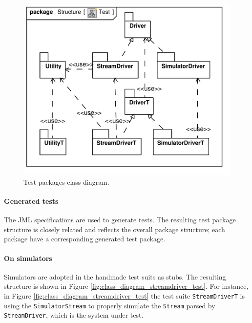 \documentclass[english]{lni}
\newcommand{\lil}[1]{\texttt{\lstinline|#1|}}
\begin{document}
\begin{figure}[htb!]
  \centering
  \includegraphics[scale=0.35]{UML_model/Class_Diagram__Structure__Test}
  \caption{Test packages class diagram.}
  \label{fig:class_diagram_test}
\end{figure}

\paragraph*{Generated tests}

The JML specifications are used to generate tests.
The resulting test package structure is closely related and reflects the overall package structure; each package have a corresponding generated test package.


\paragraph*{On simulators}

Simulators are adopted in the handmade test suits as stubs.
The resulting structure is shown in Figure \ref{fig:class_diagram_streamdriver_test}.  
For instance, in Figure \ref{fig:class_diagram_streamdriver_test} the test suite \lil{StreamDriverT} is using the \lil{SimulatorStream} to properly simulate the \lil{Stream} parsed by \lil{StreamDriver}, which is the system under test.
\end{document}
